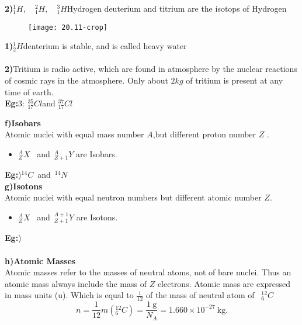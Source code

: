 \textbf{2)}\quad $^1_1H,\quad^2_1H,\quad^3_1H$\quad Hydrogen deuterium and titrium are the isotops of Hydrogen\\
\begin{figure}[H]
	\centering
	\texttt{[image: 20.11-crop]}
	\caption{}
	\label{}
\end{figure}
\begin{note}
	\textbf{1)}\quad $^1_2 H$denterium is stable, and is called heavy water\\\\
		\textbf{2)}\quad Tritium is radio active, which are found in atmosphere by the nuclear reactions of cosmic rays in the atmosphere.  Only about $2kg$ of tritium is present at any time of earth.\\
		\textbf{Eg:}\quad $3:\  ^{35}_{17} Cl $\quad and \quad $^{37}_{17} Cl$
\end{note}
\textbf{f)}\quad \textbf{Isobars}\\
Atomic nuclei with equal mass number $A$,but different proton number $Z$ .
\begin{itemize}
	\item $^A_Z X$ \  and\ $^A_{Z+1} Y$ are Isobars.
\end{itemize}
\textbf{Eg:})\quad $^{14}C$\  and\  $^{14} N$\\
\textbf{g)}\quad \textbf{Isotons}\\
Atomic nuclei with equal neutron numbers but different atomic number $Z$.
\begin{itemize}
	\item $^A_Z X$ \  and\ $^{A+1}_{Z+1} Y$ are Isotons.
\end{itemize}
\textbf{Eg:})\\\\
\textbf{h)}\quad \textbf{Atomic Masses}\\
Atomic masses refer to the masses of neutral atoms, not of bare nuclei. Thus an atomic mass always include the mass of $Z$ electrons. Atomic mass are expressed in mass units (u). Which is equal to $\frac{1}{12}$ of the mass of neutral atom of \ $^{12}_6 C$\\
$$n=\frac{1}{12} m\left({ }{^{12}_6C}\right)=\frac{1 \mathrm{~g}}{N_{A}}=1.660 \times 10^{-27} \mathrm{~kg} .$$
\begin{center}
\end{center}
